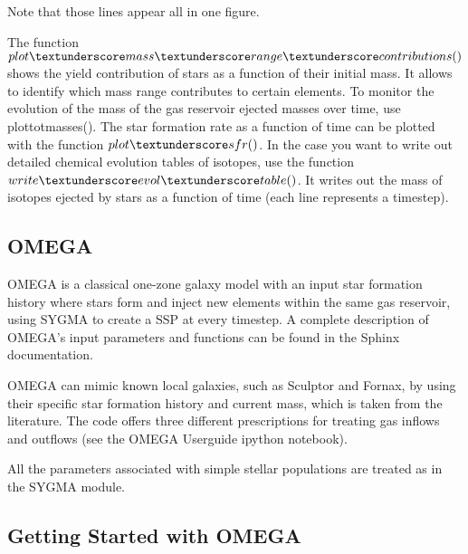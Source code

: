 Note that those lines appear all in one figure.

The function $plot\textunderscore mass\textunderscore range\textunderscore contributions()$
shows the yield contribution of stars as a function of their initial mass.
It allows to identify which mass range contributes to certain elements.
To monitor the evolution of the mass of the gas reservoir ejected
masses over time, use plot\textunderscore totmasses().
The star formation rate as a function of time can be plotted with the function $plot\textunderscore sfr()$.
In the case you want to write out detailed chemical evolution tables
of isotopes, use the function $write\textunderscore evol\textunderscore table()$.
It writes out the mass of isotopes ejected by stars as a function of time
(each line represents a timestep).

\subsection{OMEGA}

OMEGA is a classical one-zone galaxy model with
an input star formation history
where stars form and inject new elements within
the same gas reservoir, using SYGMA to create a SSP at every timestep.
A complete description of OMEGA's input parameters and functions can
be found in the Sphinx documentation.  

OMEGA can mimic known local galaxies, such as Sculptor and Fornax, by
using their specific star formation history and current mass, which is taken
from the literature.  The code offers three different prescriptions for treating
gas inflows and outflows (see the OMEGA Userguide ipython notebook).

All the parameters associated with simple stellar populations are treated as
in the SYGMA module.


\subsection{Getting Started with OMEGA}

